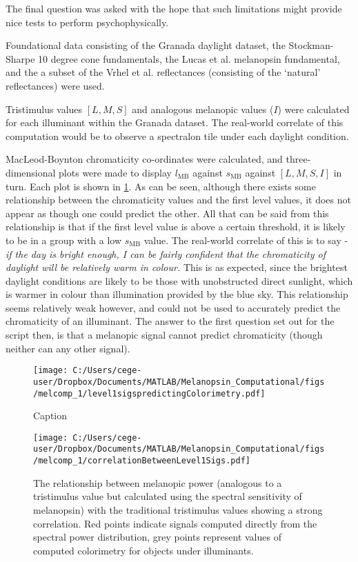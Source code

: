 \documentclass{article}
\begin{document}
The final question was asked with the hope that such limitations might provide nice tests to perform psychophysically. 

Foundational data consisting of the Granada daylight dataset, the Stockman-Sharpe 10 degree cone fundamentals, the Lucas et al. melanopsin fundamental, and the a subset of the Vrhel et al. reflectances (consisting of the `natural' reflectances) were used.

Tristimulus values $[L,M,S]$ and analogous melanopic values ($I$) were calculated for each illuminant within the Granada dataset. The real-world correlate of this computation would be to observe a spectralon tile under each daylight condition.

MacLeod-Boynton chromaticity co-ordinates were calculated, and three-dimensional plots were made to display $l_{\text{MB}}$ against $s_{\text{MB}}$ against $[L,M,S,I]$ in turn. Each plot is shown in \ref{fig:l1}. As can be seen, although there exists some relationship between the chromaticity values and the first level values, it does not appear as though one could predict the other. All that can be said from this relationship is that if the first level value is above a certain threshold, it is likely to be in a group with a low $s_{\text{MB}}$ value. The real-world correlate of this is to say - \textit{if the day is bright enough, I can be fairly confident that the chromaticity of daylight will be relatively warm in colour.} This is as expected, since the brightest daylight conditions are likely to be those with unobstructed direct sunlight, which is warmer in colour than illumination provided by the blue sky. This relationship seems relatively weak however, and could not be used to accurately predict the chromaticity of an illuminant. The answer to the first question set out for the script then, is that a melanopic signal cannot predict chromaticity (though neither can any other signal).

\begin{figure}[ht]
    \centering
    \texttt{[image: C:/Users/cege-user/Dropbox/Documents/MATLAB/Melanopsin\_Computational/figs/melcomp\_1/level1sigspredictingColorimetry.pdf]}
    \caption{Caption}
    \label{fig:l1}
\end{figure} 

\begin{figure}[ht]
    \centering
    \texttt{[image: C:/Users/cege-user/Dropbox/Documents/MATLAB/Melanopsin\_Computational/figs/melcomp\_1/correlationBetweenLevel1Sigs.pdf]}
    \caption{The relationship between melanopic power (analogous to a tristimulus value but calculated using the spectral sensitivity of melanopsin) with the traditional tristimulus values showing a strong correlation. Red points indicate signals computed directly from the spectral power distribution, grey points represent values of computed colorimetry for objects under illuminants.}
    \label{fig:tristimCorrelation}
\end{figure} 
\end{document}
